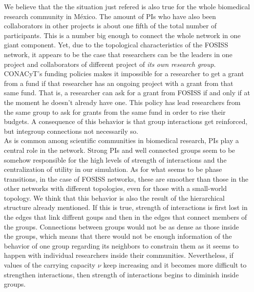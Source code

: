 \documentclass{bmcart}
\begin{document}
  We believe that the the situation just refered is also
  true for the whole biomedical research community in M\'exico. The
  amount of PIs who have also been collaborators in other projects is
  about one fifth of the total number of participants.  This is a
  number big enough to connect the whole network in one giant
  component. Yet, due to the topological characteristics of the FOSISS
  network, it appears to be the case that researchers can be the
  leaders in one project and collaborators of different project of
  \emph{its own research group}. CONACyT's funding policies makes it
  impossible for a researcher to get a grant from a fund if that
  researcher has an ongoing project with a grant from that same
  fund. That is, a researcher can ask for a grant from FOSISS if and
  only if at the moment he doesn't already have one.
  This policy has lead researchers from the same group to ask
  for grants from the same fund in order to rise their budgets. A
  consequence of this behavior is that group interactions get
  reinforced, but integroup connections not necessarily so.\\

 As is common among scientific communities in biomedical
  research, PIs play a central role in the network. Strong PIs and
  well connected groups seem to be somehow responsible for the high
  levels of strength of interactions and the centralization of utility
  in our simulation. As for what seems to be phase transitions, in the
  case of FOSISS networks, these are smoother than those in the other
  networks with different topologies, even for those with a
  small-world topology. We think that this behavior is also the result
  of the hierarchical structure already mentioned. If this is true,
  strength of interactions is first lost in the edges that link
  diffrent goups and then in the edges that connect members of the
  groups. Connections between groups would not be as dense as those
  inside the groups, which means that there would not be enough
  information of the behavior of one group regarding its neighbors to
  constrain them as it seems to happen with individual researchers
  inside their communities. Nevertheless, if values of the carrying
  capacity $\nu$ keep increasing and it becomes more difficult to
  strengthen interactions, then strength of interactions begins to
  diminish inside groups.\\
\end{document}
